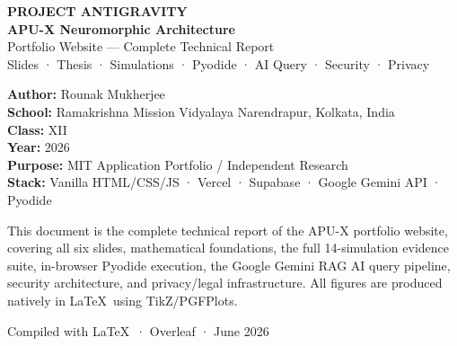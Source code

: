 \documentclass[12pt, a4paper]{article}
\begin{document}
\begin{titlepage}
  \centering
  \vspace*{2.5cm}

  {\LARGE\bfseries\color{cyancol} PROJECT ANTIGRAVITY\\[0.5em]}
  {\Large\bfseries APU-X Neuromorphic Architecture\\[0.3em]}
  {\large\color{gray} Portfolio Website — Complete Technical Report\\[0.2em]}
  {\normalsize\color{gray!60} Slides · Thesis · Simulations · Pyodide · AI Query · Security · Privacy\\[1.8cm]}


  \vspace{1.5cm}

  {\normalsize
  \textbf{Author:} Rounak Mukherjee\\[0.3em]
  \textbf{School:} Ramakrishna Mission Vidyalaya Narendrapur, Kolkata, India\\[0.3em]
  \textbf{Class:} XII\\[0.3em]
  \textbf{Year:} 2026\\[0.3em]
  \textbf{Purpose:} MIT Application Portfolio / Independent Research\\[0.3em]
  \textbf{Stack:} Vanilla HTML/CSS/JS · Vercel · Supabase · Google Gemini API · Pyodide\\
  }

  \vspace{1.5cm}


  \vspace{1cm}

  {\small\color{gray}
  This document is the complete technical report of the APU-X portfolio website,
  covering all six slides, mathematical foundations, the full 14-simulation evidence suite,
  in-browser Pyodide execution, the Google Gemini RAG AI query pipeline, security
  architecture, and privacy/legal infrastructure. All figures are produced natively
  in \LaTeX\ using TikZ/PGFPlots.
  }

  \vfill
  {\small\color{gray} Compiled with \LaTeX\ · Overleaf · June 2026}
\end{titlepage}
\end{document}
